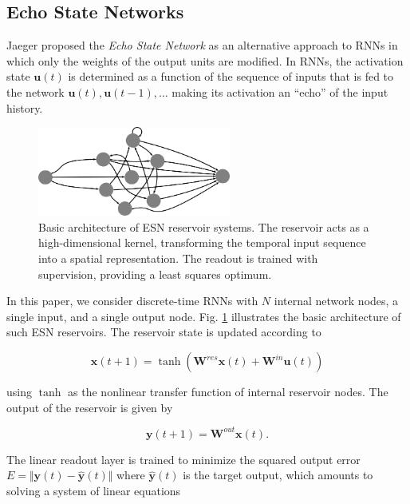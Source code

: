 \subsection{Echo State Networks}

Jaeger proposed the \textit{Echo State Network} \cite{jaeger_echo_2001} as an
alternative approach to RNNs in which only the weights of the output units are
modified. In RNNs, the activation state $\mathbf{u}(t)$ is determined as a
function of the sequence of inputs that is fed to the network $\mathbf{u}(t),
\mathbf{u}(t-1), \ldots$ making its activation an ``echo'' of the input history.

\begin{figure}[H]
  \centering
  \includegraphics[width=2.5in]{img/esn.png}
  \caption{
    Basic architecture of ESN reservoir systems. The reservoir acts as a
high-dimensional kernel, transforming the temporal input sequence into a spatial
representation. The readout is trained with supervision, providing a least
squares optimum.
  }
  \label{esn}
\end{figure}

In this paper, we consider discrete-time RNNs with $N$ internal network nodes, a
single input, and a single output node. Fig. \ref{esn} illustrates the basic
architecture of such ESN reservoirs. The reservoir state is updated according to

\begin{equation}
  \mathbf{x}(t + 1) =
    \tanh(\mathbf{W}^{res}\mathbf{x}(t)
        + \mathbf{W}^{in}\mathbf{u}(t))
  \label{xt}
\end{equation}

using $\tanh$ as the nonlinear transfer function of internal reservoir
nodes. The output of the reservoir is given by

\begin{equation}
  \mathbf{y}(t + 1) =
    \mathbf{W}^{out}\mathbf{x}(t).
  \label{yt}
\end{equation}

The linear readout layer is trained to minimize the squared output error $E =
\Vert \mathbf{y}(t) - \mathbf{\hat{y}}(t) \Vert$ where $\mathbf{\hat{y}}(t)$ is
the target output, which amounts to solving a system of linear equations

